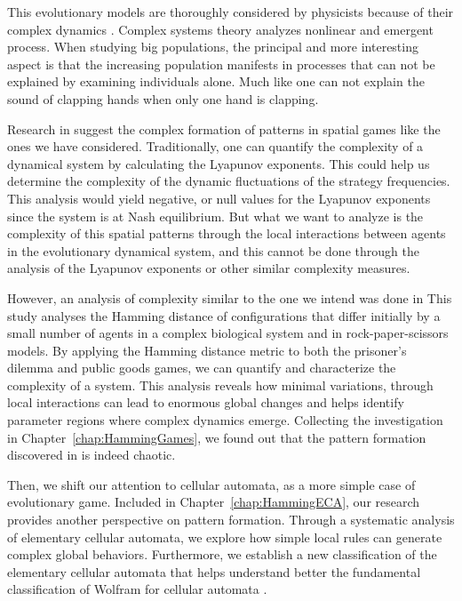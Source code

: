 This evolutionary models are thoroughly considered by physicists because of their complex dynamics \cite{GamesComplex}. Complex systems theory analyzes nonlinear and emergent process. When studying big populations, the principal and more interesting aspect is that the increasing population manifests in processes that can not be explained by examining individuals alone. Much like one can not explain the sound of clapping hands when only one hand is clapping.

Research in \cite{SpatialChaos} suggest the complex formation of patterns in spatial games like the ones we have considered. Traditionally, one can quantify the complexity of a dynamical system by calculating the Lyapunov exponents. This could help us determine the complexity of the dynamic fluctuations of the strategy frequencies. This analysis would yield negative, or null values for the Lyapunov exponents since the system is at Nash equilibrium. But what we want to analyze is the complexity of this spatial patterns through the local interactions between agents in the evolutionary dynamical system, and this cannot be done through the analysis of the Lyapunov exponents or other similar complexity measures. 

However, an analysis of complexity similar to the one we intend was done in \cite{HammingChaos1,HammingChaos2} This study analyses the Hamming distance of configurations that differ initially by a small number of agents in a complex biological system and in rock-paper-scissors models. By applying the Hamming distance metric to both the prisoner's dilemma and public goods games, we can quantify and characterize the complexity of a system. This analysis reveals how minimal variations, through local interactions can lead to enormous global changes and helps identify parameter regions where complex dynamics emerge. Collecting the investigation in Chapter~\ref{chap:HammingGames}, we found out that the pattern formation discovered in \cite{SpatialChaos} is indeed chaotic. 

Then, we shift our attention to cellular automata, as a more simple case of evolutionary game. Included in Chapter~\ref{chap:HammingECA}, our research provides another perspective on pattern formation. Through a systematic analysis of elementary cellular automata, we explore how simple local rules can generate complex global behaviors. Furthermore, we establish a new classification of the elementary cellular automata that helps understand better the fundamental classification of Wolfram for cellular automata \cite{WolframClass}.

